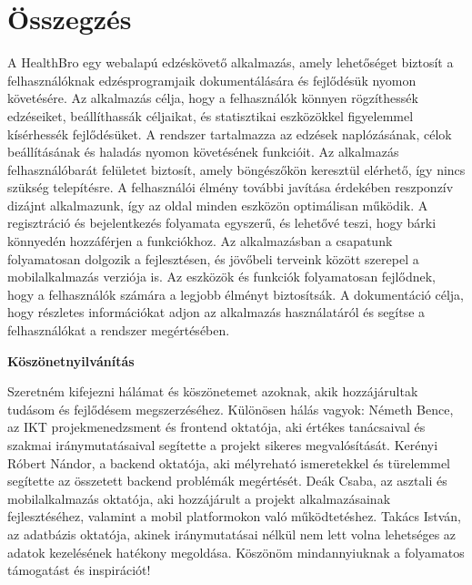 \documentclass[colorlinks]{thesis-kando}
\theoremstyle{definition}
\theoremstyle{remark}
\begin{document}
\chapter*{Összegzés}
A HealthBro egy webalapú edzéskövető alkalmazás, amely lehetőséget biztosít a felhasználóknak edzésprogramjaik dokumentálására és fejlődésük nyomon követésére. Az alkalmazás célja, hogy a felhasználók könnyen rögzíthessék edzéseiket, beállíthassák céljaikat, és statisztikai eszközökkel figyelemmel kísérhessék fejlődésüket. A rendszer tartalmazza az edzések naplózásának, célok beállításának és haladás nyomon követésének funkcióit. Az alkalmazás felhasználóbarát felületet biztosít, amely böngészőkön keresztül elérhető, így nincs szükség telepítésre. A felhasználói élmény további javítása érdekében reszponzív dizájnt alkalmazunk, így az oldal minden eszközön optimálisan működik. A regisztráció és bejelentkezés folyamata egyszerű, és lehetővé teszi, hogy bárki könnyedén hozzáférjen a funkciókhoz. Az alkalmazásban a csapatunk folyamatosan dolgozik a fejlesztésen, és jövőbeli terveink között szerepel a mobilalkalmazás verziója is. Az eszközök és funkciók folyamatosan fejlődnek, hogy a felhasználók számára a legjobb élményt biztosítsák. A dokumentáció célja, hogy részletes információkat adjon az alkalmazás használatáról és segítse a felhasználókat a rendszer megértésében.

\newpage
\Huge\begin{center}
	\textbf{Köszönetnyilvánítás}	
\end{center}\normalsize
Szeretném kifejezni hálámat és köszönetemet azoknak, akik hozzájárultak tudásom és fejlődésem megszerzéséhez. Különösen hálás vagyok:
\newline
\newline
Németh Bence, az IKT projekmenedzsment és frontend oktatója, aki értékes tanácsaival és szakmai iránymutatásaival segítette a projekt sikeres megvalósítását.
\newline
Kerényi Róbert Nándor, a backend oktatója, aki mélyreható ismeretekkel és türelemmel segítette az összetett backend problémák megértését.
\newline
Deák Csaba, az asztali és mobilalkalmazás oktatója, aki hozzájárult a projekt alkalmazásainak fejlesztéséhez, valamint a mobil platformokon való működtetéshez.
\newline
Takács István, az adatbázis oktatója, akinek iránymutatásai nélkül nem lett volna lehetséges az adatok kezelésének hatékony megoldása.
\newline
\newline
Köszönöm mindannyiuknak a folyamatos támogatást és inspirációt!
\end{document}
